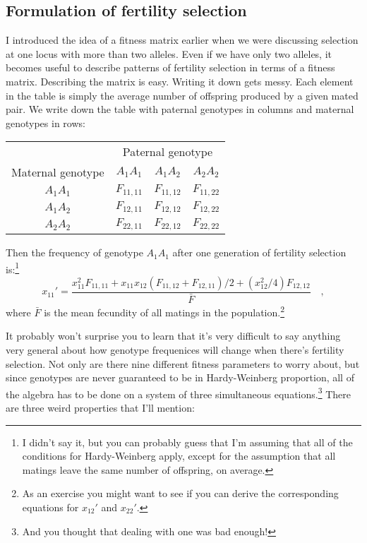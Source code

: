 \subsection*{Formulation of fertility selection}

I introduced the idea of a fitness matrix earlier when we were
discussing selection at one locus with more than two alleles. Even if
we have only two alleles, it becomes useful to describe patterns of
fertility selection in terms of a fitness matrix. Describing the
matrix is easy. Writing it down gets messy. Each element in the table
is simply the average number of offspring produced by a given mated
pair. We write down the table with paternal genotypes in columns and
maternal genotypes in rows:
\begin{center}
\begin{tabular}{c|ccc}
\hline\hline
                  & \multicolumn{3}{c}{Paternal genotype} \\
Maternal genotype & $A_1A_1$ & $A_1A_2$ & $A_2A_2$ \\
\hline
$A_1A_1$ & $F_{11,11}$ & $F_{11,12}$ & $F_{11,22}$ \\
$A_1A_2$ & $F_{12,11}$ & $F_{12,12}$ & $F_{12,22}$ \\
$A_2A_2$ & $F_{22,11}$ & $F_{22,12}$ & $F_{22,22}$ \\
\hline
\end{tabular}
\end{center}
Then the frequency of genotype $A_1A_1$ after one generation of
fertility selection is:\footnote{I didn't say it, but you can probably
  guess that I'm assuming that all of the conditions for
  Hardy-Weinberg apply, except for the assumption that all matings
  leave the same number of offspring, on average.}
\begin{equation}
x_{11}' = \frac{x_{11}^2F_{11,11} + x_{11}x_{12}(F_{11,12} +
                F_{12,11})/2 + (x_{12}^2/4)F_{12,12}}{\bar F} \quad ,
\label{eq:fertility}
\end{equation}
where $\bar F$ is the mean fecundity of all matings in the
population.\footnote{As an exercise you might want to see if you can
derive the corresponding equations for $x_{12}'$ and $x_{22}'$.}

It probably won't surprise you to learn that it's very difficult to
say anything very general about how genotype frequenices will change
when there's fertility selection. Not only are there nine different
fitness parameters to worry about, but since genotypes are never
guaranteed to be in Hardy-Weinberg proportion, all of the algebra has
to be done on a system of three simultaneous equations.\footnote{And
you thought that dealing with one was bad enough!} There are three
weird properties that I'll mention:

